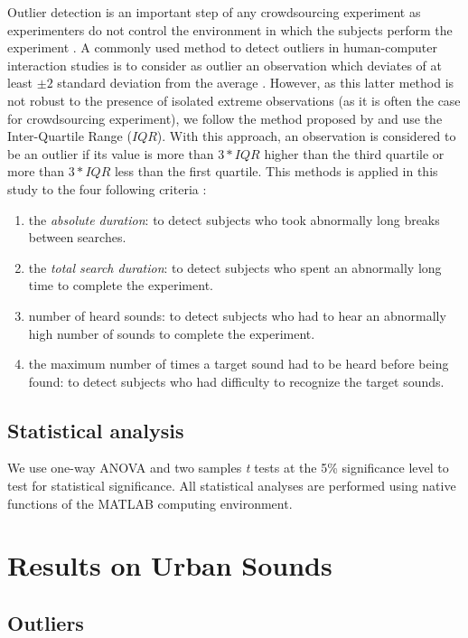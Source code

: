 \documentclass{aes2e}
\begin{document}
Outlier detection is an important step of any crowdsourcing experiment as experimenters do not control the environment in which the subjects perform the experiment \cite{komarov2013crowdsourcing,buchholz2011crowdsourcing}. A commonly used method to detect outliers in  human-computer interaction studies is to consider as outlier an observation  which deviates of at least $\pm2$ standard deviation from the average \cite{komarov2013crowdsourcing}. However, as this latter method is not robust to the presence of isolated extreme observations (as it is often the case for crowdsourcing experiment), we follow the  method proposed by \cite{komarov2013crowdsourcing} and use the Inter-Quartile Range ($IQR$). With this approach, an observation is considered to be an outlier if its value is more than $3*IQR$ higher than the third quartile or more than $3*IQR$ less than the first quartile. This methods is applied in this study to the four following criteria :

\begin{enumerate}
\item the \textit{absolute duration}: to detect subjects who took abnormally long breaks between searches.
\item the \textit{total search duration}: to detect subjects who spent an abnormally long time to complete the experiment.
\item number of heard sounds: to detect subjects who had to hear an abnormally high number of sounds to complete the experiment.
\item the maximum number of times a target sound had to be heard before being found: to detect subjects who had difficulty to recognize the target sounds.
\end{enumerate}

\subsection{Statistical analysis}

We use one-way ANOVA and two samples \textit{t} tests at the 5\% significance level to test for statistical significance. All statistical analyses are performed using native functions of the MATLAB computing environment.


\section{Results on Urban Sounds} \label{resultsu}

\subsection{Outliers}
\end{document}
